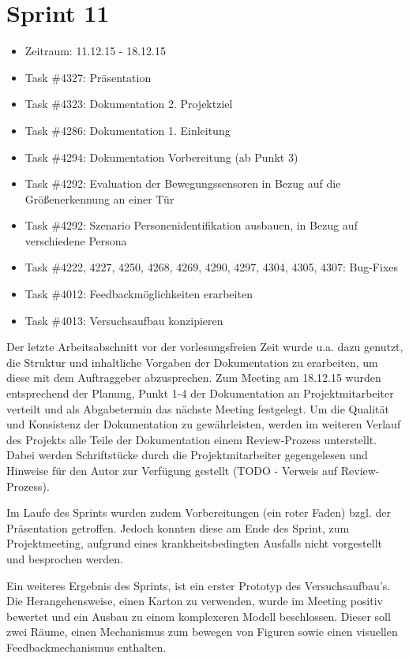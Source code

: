 \documentclass[12pt, oneside, smallheadings]{scrbook}
\begin{document}
\section{Sprint 11}
\begin{itemize}
	\item Zeitraum: 11.12.15 - 18.12.15 \newline
	\item Task \#4327: Präsentation
	\item Task \#4323: Dokumentation 2. Projektziel
	\item Task \#4286: Dokumentation 1. Einleitung
	\item Task \#4294: Dokumentation Vorbereitung (ab Punkt 3)
	\item Task \#4292: Evaluation der Bewegungssensoren in Bezug auf die Größenerkennung an einer Tür
	\item Task \#4292: Szenario Personenidentifikation ausbauen, in Bezug auf verschiedene Persona
	\item Task \#4222, 4227, 4250, 4268, 4269, 4290, 4297, 4304, 4305, 4307: Bug-Fixes
	\item Task \#4012: Feedbackmöglichkeiten erarbeiten
	\item Task \#4013: Versuchsaufbau konzipieren\\
\end{itemize}
\noindent
Der letzte Arbeitsabschnitt vor der vorlesungsfreien Zeit wurde u.a. dazu genutzt, die Struktur und inhaltliche Vorgaben der Dokumentation zu erarbeiten, um diese mit dem Auftraggeber abzusprechen. Zum Meeting am 18.12.15 wurden entsprechend der Planung, Punkt 1-4 der Dokumentation an Projektmitarbeiter verteilt und als Abgabetermin das nächste Meeting festgelegt. Um die Qualität und Konsistenz der Dokumentation zu gewährleisten, werden im weiteren Verlauf des Projekts alle Teile der Dokumentation einem Review-Prozess unterstellt. Dabei werden Schriftstücke durch die Projektmitarbeiter gegengelesen und Hinweise für den Autor zur Verfügung gestellt (TODO - Verweis auf Review-Prozess).

Im Laufe des Sprints wurden zudem Vorbereitungen (ein roter Faden) bzgl. der Präsentation getroffen. Jedoch konnten diese am Ende des Sprint, zum Projektmeeting, aufgrund eines krankheitsbedingten Ausfalls nicht vorgestellt und besprochen werden. 

Ein weiteres Ergebnis des Sprints, ist ein erster Prototyp des Versuchsaufbau's. Die Herangehensweise, einen Karton zu verwenden, wurde im Meeting positiv bewertet und ein Ausbau zu einem komplexeren Modell beschlossen. Dieser soll zwei Räume, einen Mechanismus zum bewegen von Figuren sowie einen visuellen Feedbackmechanismus enthalten.
\end{document}
